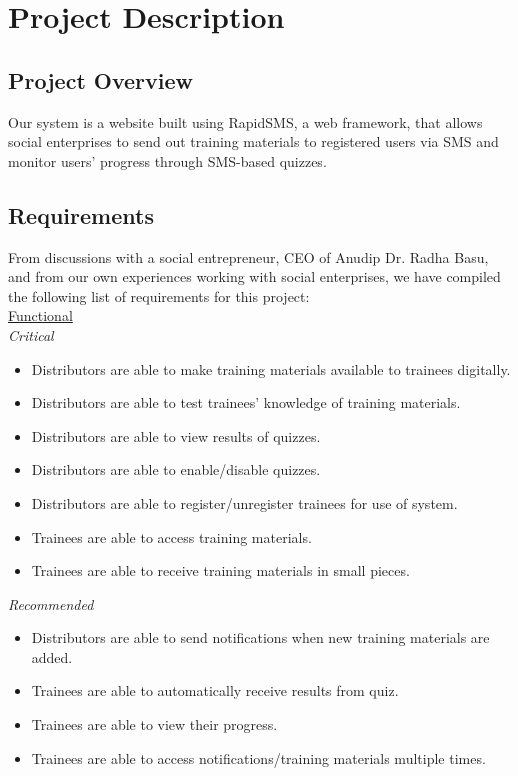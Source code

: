\chapter{Project Description}

\section{Project Overview}
Our system is a website built using RapidSMS, a web framework, that allows social enterprises to send out training materials to registered users via SMS and monitor users’ progress through SMS-based quizzes.

\section{Requirements}
From discussions with a social entrepreneur, CEO of Anudip Dr. Radha Basu, and from our own experiences working with social enterprises, we have compiled the following list of requirements for this project: \\[-0.7\baselineskip]

\underline{Functional}\\
\textit{Critical}
\begin{itemize}
\item Distributors are able to make training materials available to trainees digitally.
\item Distributors are able to test trainees’ knowledge of training materials.
\item Distributors are able to view results of quizzes.
\item Distributors are able to enable/disable quizzes.
\item Distributors are able to register/unregister trainees for use of system.
\item Trainees are able to access training materials.
\item Trainees are able to receive training materials in small pieces.
\end{itemize}

\textit{Recommended}
\begin{itemize}
\item Distributors are able to send notifications when new training materials are added.
\item Trainees are able to automatically receive results from quiz.
\item Trainees are able to view their progress.
\item Trainees are able to access notifications/training materials multiple times.
\end{itemize}

